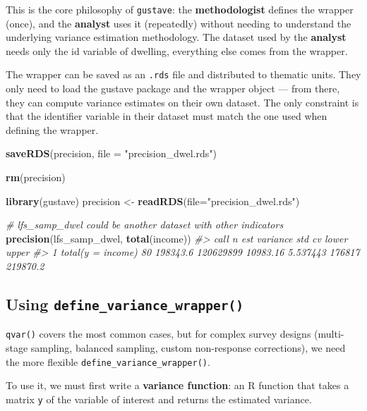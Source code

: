 \documentclass[
]{article}
\newenvironment{Shaded}{\begin{snugshade}}{\end{snugshade}}
\newcommand{\AttributeTok}[1]{\textcolor[rgb]{0.13,0.29,0.53}{#1}}
\newcommand{\CommentTok}[1]{\textcolor[rgb]{0.56,0.35,0.01}{\textit{#1}}}
\newcommand{\FunctionTok}[1]{\textcolor[rgb]{0.13,0.29,0.53}{\textbf{#1}}}
\newcommand{\NormalTok}[1]{#1}
\newcommand{\OtherTok}[1]{\textcolor[rgb]{0.56,0.35,0.01}{#1}}
\newcommand{\StringTok}[1]{\textcolor[rgb]{0.31,0.60,0.02}{#1}}
\begin{document}
This is the core philosophy of \texttt{gustave}: the
\textbf{methodologist} defines the wrapper (once), and the
\textbf{analyst} uses it (repeatedly) without needing to understand the
underlying variance estimation methodology. The dataset used by the
\textbf{analyst} needs only the id variable of dwelling, everything else
comes from the wrapper.

The wrapper can be saved as an \texttt{.rds} file and distributed to
thematic units. They only need to load the gustave package and the
wrapper object --- from there, they can compute variance estimates on
their own dataset. The only constraint is that the identifier variable
in their dataset must match the one used when defining the wrapper.

\begin{Shaded}
\begin{Highlighting}[]
\FunctionTok{saveRDS}\NormalTok{(precision, }\AttributeTok{file =} \StringTok{"precision\_dwel.rds"}\NormalTok{)}

\FunctionTok{rm}\NormalTok{(precision)}

\FunctionTok{library}\NormalTok{(gustave)}
\NormalTok{precision }\OtherTok{\textless{}{-}} \FunctionTok{readRDS}\NormalTok{(}\AttributeTok{file=}\StringTok{"precision\_dwel.rds"}\NormalTok{)}

\CommentTok{\# lfs\_samp\_dwel could be another dataset with other indicators}
\FunctionTok{precision}\NormalTok{(lfs\_samp\_dwel, }\FunctionTok{total}\NormalTok{(income))}
\CommentTok{\#\textgreater{}                call  n      est  variance      std       cv  lower    upper}
\CommentTok{\#\textgreater{} 1 total(y = income) 80 198343.6 120629899 10983.16 5.537443 176817 219870.2}
\end{Highlighting}
\end{Shaded}

\subsection{\texorpdfstring{Using
\texttt{define\_variance\_wrapper()}}{Using define\_variance\_wrapper()}}\label{using-define_variance_wrapper}

\texttt{qvar()} covers the most common cases, but for complex survey
designs (multi-stage sampling, balanced sampling, custom non-response
corrections), we need the more flexible
\texttt{define\_variance\_wrapper()}.

To use it, we must first write a \textbf{variance function}: an R
function that takes a matrix \texttt{y} of the variable of interest and
returns the estimated variance.
\end{document}
